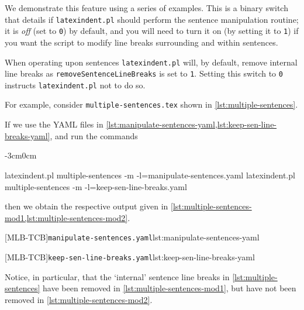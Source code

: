 \documentclass[10pt]{article}
\newenvironment{widepage}{\begin{adjustwidth}{-3cm}{0cm}}{\end{adjustwidth}}
\begin{document}
 We demonstrate this feature using a series of examples.
 This is a binary switch that details if \texttt{latexindent.pl} should perform the
 sentence manipulation routine; it is \emph{off} (set to \texttt{0}) by default, and you
 will need to turn it on (by setting it to \texttt{1}) if you want the script to modify
 line breaks surrounding and within sentences.

 When operating upon sentences \texttt{latexindent.pl} will, by default, remove internal
 line breaks as \texttt{removeSentenceLineBreaks} is set to \texttt{1}. Setting this
 switch to \texttt{0} instructs \texttt{latexindent.pl} not to do so.

 \begin{example}
 For example, consider \texttt{multiple-sentences.tex} shown in
 \cref{lst:multiple-sentences}.


 If we use the YAML files in
 \cref{lst:manipulate-sentences-yaml,lst:keep-sen-line-breaks-yaml}, and run the commands
  
 \begin{widepage}

  \begin{commandshell}
latexindent.pl multiple-sentences -m -l=manipulate-sentences.yaml
latexindent.pl multiple-sentences -m -l=keep-sen-line-breaks.yaml
\end{commandshell}

 \end{widepage}
 then we obtain the respective output given in
 \cref{lst:multiple-sentences-mod1,lst:multiple-sentences-mod2}.

 \begin{cmhtcbraster}
  [MLB-TCB]{\texttt{manipulate-sentences.yaml}}{lst:manipulate-sentences-yaml}
 \end{cmhtcbraster}

 \begin{cmhtcbraster}
  [MLB-TCB]{\texttt{keep-sen-line-breaks.yaml}}{lst:keep-sen-line-breaks-yaml}
 \end{cmhtcbraster}

 Notice, in particular, that the `internal' sentence line breaks in
 \cref{lst:multiple-sentences} have been removed in \cref{lst:multiple-sentences-mod1},
 but have not been removed in \cref{lst:multiple-sentences-mod2}.
 \end{example}
\end{document}
